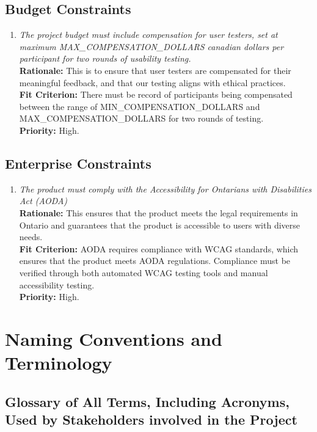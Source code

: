 \documentclass[12pt]{article}
\begin{document}
\subsection{Budget Constraints}
\begin{enumerate}[label=MD-BC \arabic*., wide=0pt, leftmargin=*]
  \item \emph{The project budget must include compensation for user
      testers, set at maximum MAX\_COMPENSATION\_DOLLARS canadian dollars per participant for two rounds
    of usability testing.}\\[2mm]
    {\bf Rationale:} This is to ensure that user testers are
    compensated for their meaningful feedback,
    and that our testing aligns with ethical practices.\\
    {\bf Fit Criterion:} There must be record of participants being
    compensated between the range of MIN\_COMPENSATION\_DOLLARS and MAX\_COMPENSATION\_DOLLARS for
    two rounds of testing. \\
    {\bf Priority:} High.
\end{enumerate}
\subsection{Enterprise Constraints}
\begin{enumerate}[label=MD-EC \arabic*., wide=0pt, leftmargin=*]
  \item \emph{The product must comply with the Accessibility for
    Ontarians with Disabilities Act (AODA)}\\[2mm]
    {\bf Rationale:} This ensures that the product meets the legal
    requirements in Ontario and guarantees that
    the product is accessible to users with diverse needs.\\
    {\bf Fit Criterion:} AODA requires compliance with WCAG
    standards, which ensures that the product meets AODA regulations.
    Compliance must be verified through both automated WCAG testing
    tools and manual accessibility testing.\\
    {\bf Priority:} High.
\end{enumerate}

\section{Naming Conventions and Terminology}
\subsection{Glossary of All Terms, Including Acronyms, Used by Stakeholders
involved in the Project}
\end{document}
